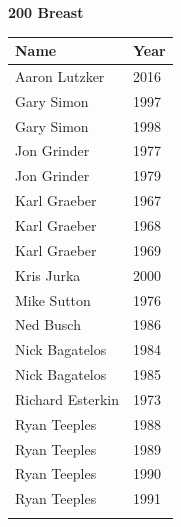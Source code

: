 \vspace{1.2em}
\noindent\begin{minipage}[t]{0.48\textwidth}
\centering
\textbf{\textcolor{teamprimary}{200 Breast}}\par
\vspace{0.5em}
\centering
\small
\renewcommand{\arraystretch}{1.0}
\setlength{\tabcolsep}{4pt}
\begin{tabular}{@{}p{3.0cm}p{1.0cm}@{}}
\toprule
\textbf{Name} & \textbf{Year} \\
\midrule
Aaron Lutzker & 2016 \\
Gary Simon & 1997 \\
Gary Simon & 1998 \\
Jon Grinder & 1977 \\
Jon Grinder & 1979 \\
Karl Graeber & 1967 \\
Karl Graeber & 1968 \\
Karl Graeber & 1969 \\
Kris Jurka & 2000 \\
Mike Sutton & 1976 \\
Ned Busch & 1986 \\
Nick Bagatelos & 1984 \\
Nick Bagatelos & 1985 \\
Richard Esterkin & 1973 \\
Ryan Teeples & 1988 \\
Ryan Teeples & 1989 \\
Ryan Teeples & 1990 \\
Ryan Teeples & 1991 \\
\bottomrule
\vspace{0.5em}
\end{tabular}
\end{minipage}
\hfill

